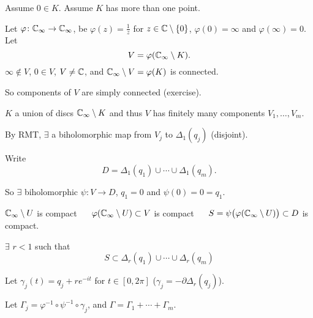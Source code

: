 \documentclass[10pt,aspectratio=169]{beamer}
\begin{document}
\begin{frame}
Assume $0 \in K$. \pause
Assume $K$ has more than one point.

\medskip
\pause

Let $\varphi \colon {\mathbb{C}}_\infty \to {\mathbb{C}}_\infty$, be $\varphi(z) = \frac{1}{z}$ for $z \in {\mathbb{C}} \setminus \{ 0 \}$,
$\varphi(0) = \infty$ and $\varphi(\infty) = 0$. \pause
Let
\[
V = \varphi({\mathbb{C}}_\infty \setminus K) .
\]
\pause
$\infty \notin V$,
\pause
$0 \in V$,
\pause
$V \not= {\mathbb{C}}$,
\pause
and ${\mathbb{C}}_\infty \setminus V = \varphi(K)$ is connected.

\pause
So components of $V$ are simply connected (exercise).

\pause
$K$ a union of discs \wthus
${\mathbb{C}}_\infty \setminus K$ and thus $V$ has finitely many components $V_1,\ldots,V_m$.

\medskip
\pause

By RMT, $\exists$
a biholomorphic map from $V_j$ to $\Delta_1(q_j)$ (disjoint).

\pause
Write \[D = \Delta_1(q_1) \cup \cdots \cup \Delta_1(q_m).\]

\pause
So $\exists$ biholomorphic $\psi \colon V \to D$, \pause $q_1=0$ and
$\psi(0)=0=q_1$.

\pause
${\mathbb{C}}_\infty \setminus U$ is compact
\pause 
~\thus~
$\varphi({\mathbb{C}}_\infty \setminus U) \subset V$ is compact
\pause
~\thus~
$S = \psi\bigl(\varphi({\mathbb{C}}_\infty \setminus U)\bigr) \subset D$
is compact.

\pause
$\exists$ $r < 1$ such that
\[
S \subset \Delta_r(q_1) \cup \cdots \cup \Delta_r(q_m)
\]

\pause
Let $\gamma_j(t) = q_j + r e^{-it}$ for $t \in [0,2\pi]$ \quad ($\gamma_j = -\partial
\Delta_r(q_j)$).

\pause
Let $\Gamma_j = \varphi^{-1} \circ \psi^{-1} \circ \gamma_j$, and $\Gamma = \Gamma_1 +
\cdots + \Gamma_m$.
\end{frame}
\end{document}

